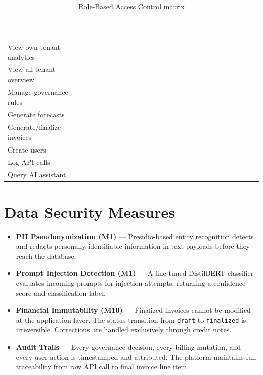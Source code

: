 \documentclass[12pt,a4paper,twoside]{report}
\newcommand{\cmark}{\ding{51}}
\newcommand{\xmark}{\ding{55}}
\begin{document}
\begin{table}[H]
\centering
\begin{tabularx}{\textwidth}{|l|c|c|c|c|}
\hline
\rowcolor{tabheader}
\textcolor{white}{\textbf{Capability}} &
\textcolor{white}{\textbf{Super Admin}} &
\textcolor{white}{\textbf{Tenant Admin}} &
\textcolor{white}{\textbf{Tenant Viewer}} &
\textcolor{white}{\textbf{API Key}} \\
\hline
View own-tenant analytics & \cmark & \cmark & \cmark & \cmark \\
\hline
View all-tenant overview & \cmark & \xmark & \xmark & \xmark \\
\hline
Manage governance rules & \cmark & \cmark & \xmark & \xmark \\
\hline
Generate forecasts & \cmark & \cmark & \xmark & \xmark \\
\hline
Generate/finalize invoices & \cmark & \xmark & \xmark & \xmark \\
\hline
Create users & \cmark & \xmark & \xmark & \xmark \\
\hline
Log API calls & \cmark & \cmark & \cmark & \cmark \\
\hline
Query AI assistant & \cmark & \cmark & \cmark & \xmark \\
\hline
\end{tabularx}
\caption{Role-Based Access Control matrix}
\label{tab:rbac}
\end{table}

\section{Data Security Measures}

\begin{itemize}
  \item \textbf{PII Pseudonymization (M1)} — Presidio-based entity recognition detects and redacts personally identifiable information in text payloads before they reach the database.

  \item \textbf{Prompt Injection Detection (M1)} — A fine-tuned DistilBERT classifier evaluates incoming prompts for injection attempts, returning a confidence score and classification label.

  \item \textbf{Financial Immutability (M10)} — Finalized invoices cannot be modified at the application layer. The status transition from \texttt{draft} to \texttt{finalized} is irreversible. Corrections are handled exclusively through credit notes.

  \item \textbf{Audit Trails} — Every governance decision, every billing mutation, and every user action is timestamped and attributed. The platform maintains full traceability from raw API call to final invoice line item.
\end{itemize}
\end{document}
